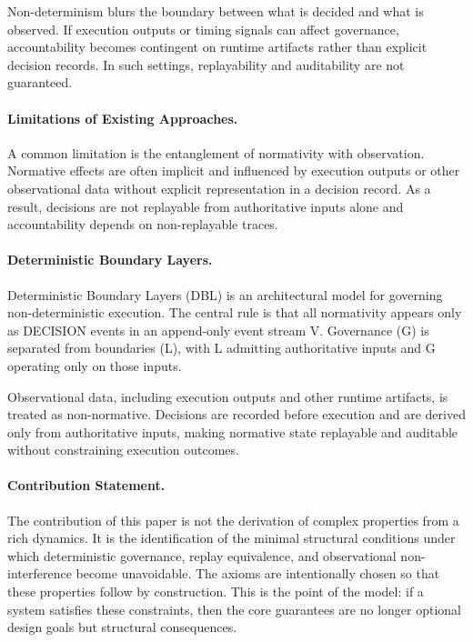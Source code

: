 \documentclass[11pt]{article}
\begin{document}
Non-determinism blurs the boundary between what is decided and what is observed. If execution outputs or timing signals can affect governance, accountability becomes contingent on runtime artifacts rather than explicit decision records. In such settings, replayability and auditability are not guaranteed.

\paragraph{Limitations of Existing Approaches.}
A common limitation is the entanglement of normativity with observation. Normative effects are often implicit and influenced by execution outputs or other observational data without explicit representation in a decision record. As a result, decisions are not replayable from authoritative inputs alone and accountability depends on non-replayable traces.

\paragraph{Deterministic Boundary Layers.}
Deterministic Boundary Layers (DBL) is an architectural model for governing non-deterministic execution. The central rule is that all normativity appears only as DECISION events in an append-only event stream V. Governance (G) is separated from boundaries (L), with L admitting authoritative inputs and G operating only on those inputs.

Observational data, including execution outputs and other runtime artifacts, is treated as non-normative. Decisions are recorded before execution and are derived only from authoritative inputs, making normative state replayable and auditable without constraining execution outcomes.

\paragraph{Contribution Statement.}
The contribution of this paper is not the derivation of complex properties from a rich dynamics. It is the identification of the minimal structural conditions under which deterministic governance, replay equivalence, and observational non-interference become unavoidable. The axioms are intentionally chosen so that these properties follow by construction. This is the point of the model: if a system satisfies these constraints, then the core guarantees are no longer optional design goals but structural consequences.
\end{document}
